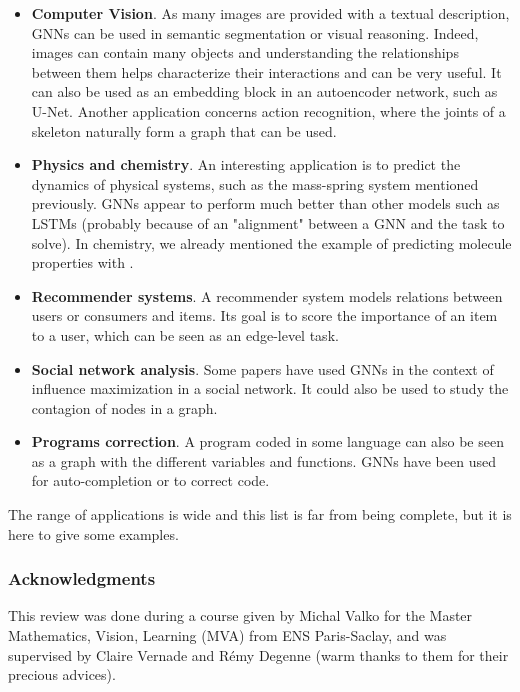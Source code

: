 \documentclass{article}
\begin{document}
\begin{itemize}
    \item \textbf{Computer Vision}. As many images are provided with a textual description, GNNs can be used in semantic segmentation or visual reasoning. Indeed, images can contain many objects and understanding the relationships between them helps characterize their interactions and can be very useful. It can also be used as an embedding block in an autoencoder network, such as U-Net. Another application concerns action recognition, where the joints of a skeleton naturally form a graph that can be used.
    
    \item \textbf{Physics and chemistry}. An interesting application is to predict the dynamics of physical systems, such as the mass-spring system mentioned previously. GNNs appear to perform much better than other models such as LSTMs (probably because of an "alignment" between a GNN and the task to solve). In chemistry, we already mentioned the example of predicting molecule properties with \cite{gilmer2017neural}.
    
    \item \textbf{Recommender systems}. A recommender system models relations between users or consumers and items. Its goal is to score the importance of an item to a user, which can be seen as an edge-level task.
    
    \item \textbf{Social network analysis}. Some papers have used GNNs in the context of influence maximization in a social network. It could also be used to study the contagion of nodes in a graph.
    
    \item \textbf{Programs correction}. A program coded in some language can also be seen as a graph with the different variables and functions. GNNs have been used for auto-completion or to correct code.
\end{itemize}

The range of applications is wide and this list is far from being complete, but it is here to give some examples.


\subsubsection*{Acknowledgments}

This review was done during a course given by Michal Valko for the Master Mathematics, Vision, Learning (MVA) from ENS Paris-Saclay, and was supervised by Claire Vernade and Rémy Degenne (warm thanks to them for their precious advices).

\medskip

\small



\end{document}
